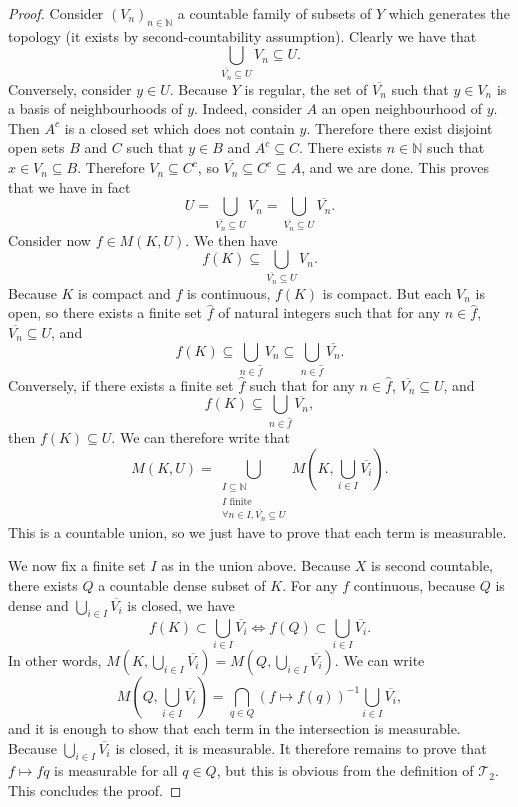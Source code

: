 \begin{proof}
Consider $(V_n)_{n \in \mathbb{N}}$ a countable family of subsets of $Y$ which generates the topology (it exists by second-countability assumption). Clearly we have that
$$\bigcup_{\overline{V_n} \subseteq U} V_n \subseteq U.$$
Conversely, consider $y \in U$. Because $Y$ is regular, the set of $\overline{V_n}$ such that $y \in V_n$ is a basis of neighbourhoods of $y$. Indeed, consider $A$ an open neighbourhood of $y$. Then $A^c$ is a closed set which does not contain $y$. Therefore there exist disjoint open sets $B$ and $C$ such that $y \in B$ and $A^c \subseteq C$. There exists $n \in \mathbb{N}$ such that $x \in V_n \subseteq B$. Therefore $V_n \subseteq C^c$, so $\overline{V_n} \subseteq C^c \subseteq A$, and we are done. This proves that we have in fact
$$U = \bigcup_{\overline{V_n} \subseteq U} V_n = \bigcup_{\overline{V_n} \subseteq U} \overline{V_n}.$$
Consider now $f \in M(K, U)$. We then have
$$f(K) \subseteq \bigcup_{\overline{V_n} \subseteq U} V_n.$$
Because $K$ is compact and $f$ is continuous, $f(K)$ is compact. But each $V_n$ is open, so there exists a finite set $\hat{f}$ of natural integers such that for any $n \in \hat{f}$, $\overline{V_n} \subseteq U$, and
$$f(K) \subseteq \bigcup_{n \in \hat{f}} V_n \subseteq \bigcup_{n \in \hat{f}} \overline{V_n}.$$
Conversely, if there exists a finite set $\hat{f}$ such that for any $n \in \hat{f}$, $\overline{V_n} \subseteq U$, and
$$f(K) \subseteq \bigcup_{n \in \hat{f}} \overline{V_n},$$
then $f(K) \subseteq U$. We can therefore write that
$$M(K, U) = \bigcup_{\substack{I \subseteq \mathbb{N} \\ I \text{ finite} \\ \forall n \in I, \overline{V_n} \subseteq U}} M\left(K, \bigcup_{i \in I} \overline{V_i}\right).$$
This is a countable union, so we just have to prove that each term is measurable.

We now fix a finite set $I$ as in the union above. Because $X$ is second countable, there exists $Q$ a countable dense subset of $K$. For any $f$ continuous, because $Q$ is dense and $\bigcup_{i \in I} \overline{V_i}$ is closed, we have
$$f(K) \subset \bigcup_{i \in I} \overline{V_i} \Longleftrightarrow f(Q) \subset \bigcup_{i \in I} \overline{V_i}.$$
In other words, $M\left(K, \bigcup_{i \in I} \overline{V_i}\right) = M\left(Q, \bigcup_{i \in I} \overline{V_i}\right)$. We can write
$$M\left(Q, \bigcup_{i \in I} \overline{V_i}\right) = \bigcap_{q \in Q} (f \mapsto f(q))^{-1} \bigcup_{i \in I} \overline{V_i},$$
and it is enough to show that each term in the intersection is measurable. Because $\bigcup_{i \in I} \overline{V_i}$ is closed, it is measurable. It therefore remains to prove that $f \mapsto f q$ is measurable for all $q \in Q$, but this is obvious from the definition of $\mathcal{T}_2$. This concludes the proof.
\end{proof}


